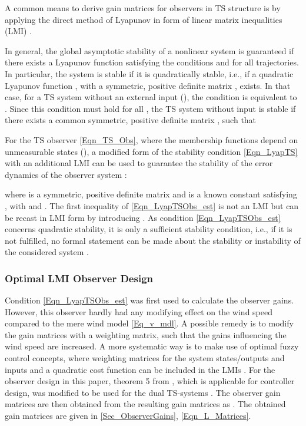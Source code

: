 \documentclass[a4paper]{article}
\begin{document}
A common means to derive gain matrices for observers in TS structure is by applying the direct method of Lyapunov in form of linear matrix inequalities (LMI) \cite{Lendek:2010}.

In general, the global asymptotic stability of a nonlinear system  is guaranteed if there exists a Lyapunov function  satisfying the conditions  and  for all trajectories. In particular, the system is stable if it is quadratically stable, i.e., if a quadratic Lyapunov function , with a symmetric, positive definite matrix , exists.
\newline In that case, for a TS system without an external input (), the condition  is equivalent to
. Since this condition must hold for all , the TS system without input is stable if there exists a common symmetric, positive definite matrix , such that



\newline For the TS observer \eqref{Eqn_TS_Obs}, where the membership functions depend on unmeasurable states (), a modified form of the stability condition \eqref{Eqn_LyapTS} with an additional LMI can be used to guarantee the stability of the error dynamics of the observer system \cite{BergstenPalmDriankov:2001}:



\newline where  is a symmetric, positive definite matrix and  is a known constant satisfying ,
with  and 
. The first inequality of \eqref{Eqn_LyapTSObs_est} is not an LMI but can be recast in LMI form by introducing  \cite{Tanaka:2001}. As condition \eqref{Eqn_LyapTSObs_est} concerns quadratic stability, it is only a sufficient stability condition, i.e., if it is not fulfilled, no formal statement can be made about the stability or instability of the considered system \cite{Lendek:2010}.

\subsubsection*{Optimal LMI Observer Design}

Condition \eqref{Eqn_LyapTSObs_est} was first used to calculate the observer gains. However, this observer hardly had any modifying effect on the wind speed compared to the mere wind model \eqref{Eq_v_mdl}.
A possible remedy is to modify the gain matrices with a weighting matrix, such that the gains influencing the wind speed  are increased. A more systematic way is to make use of optimal fuzzy control concepts, where weighting matrices for the system states/outputs and inputs and a quadratic cost function can be included in the LMIs \cite{TanakaTaniguchiWang1:1998}.
\newline For the observer design in this paper, theorem 5 from \cite{TanakaTaniguchiWang1:1998}, which is applicable for controller design, was modified to be used for the dual TS-systems . The observer gain matrices  are then obtained from the resulting gain matrices  as . The obtained gain matrices are given in \ref{Sec_ObserverGains}, \eqref{Eqn_L_Matrices}.
\end{document}
